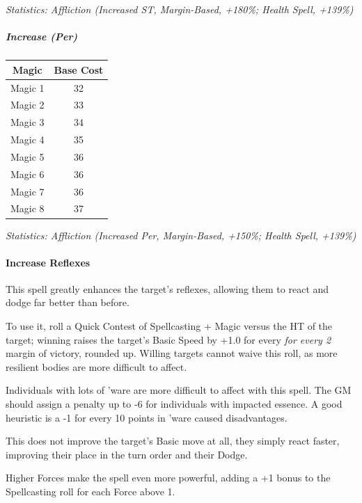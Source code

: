 \begin{multicols}{3}
	\textcolor{OliveGreen}{\textit{Statistics: Affliction (Increased ST, Margin-Based, +180\%; Health Spell, +139\%) }}
	
	
	\subparagraph{Increase (Per)}
	
	\begin{center}
		\begin{tabular}{|c|c|}
			\hline
			Magic & Base Cost \\
			\hline
			\hline
			Magic 1 & 32 \\
			Magic 2 & 33 \\
			Magic 3 & 34 \\
			Magic 4 & 35 \\
			Magic 5 & 36 \\
			Magic 6 & 36 \\
			Magic 7 & 36 \\
			Magic 8 & 37 \\
			\hline
		\end{tabular}
	\end{center}	
	
	\textcolor{OliveGreen}{\textit{Statistics: Affliction (Increased Per, Margin-Based, +150\%; Health Spell, +139\%) }}
	
	\paragraph{Increase Reflexes}
	
	This spell greatly enhances the target's reflexes, allowing them to react and dodge far better than before.
	
	To use it, roll a Quick Contest of Spellcasting + Magic versus the HT of the target; winning raises the target's Basic Speed by +1.0 for every \textit{for every 2} margin of victory, rounded up. Willing targets cannot waive this roll, as more resilient bodies are more difficult to affect.
	
	Individuals with lots of 'ware are more difficult to affect with this spell. The GM should assign a penalty up to -6 for individuals with impacted essence. A good heuristic is a -1 for every 10 points in 'ware caused disadvantages.
	
	This does not improve the target's Basic move at all, they simply react faster, improving their place in the turn order and their Dodge.
	
	Higher Forces make the spell even more powerful, adding a +1 bonus to the Spellcasting roll for each Force above 1.	
	

\end{multicols}
